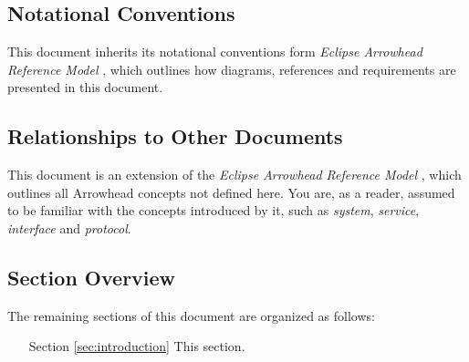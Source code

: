\subsection{Notational Conventions}
\label{sec:introduction:conventions}

This document inherits its notational conventions form \textit{Eclipse Arrowhead Reference Model} \cite{palm2021reference}, which outlines how diagrams, references and requirements are presented in this document.

\subsection{Relationships to Other Documents}
\label{sec:introduction:relationships}

This document is an extension of the \textit{Eclipse Arrowhead Reference Model} \cite{palm2021reference}, which outlines all Arrowhead concepts not defined here.
You are, as a reader, assumed to be familiar with the concepts introduced by it, such as \textit{system}, \textit{service}, \textit{interface} and \textit{protocol}.

\subsection{Section Overview}
\label{sec:introduction:sections}

The remaining sections of this document are organized as follows:
\vspace*{2mm}
\begin{itemize}[leftmargin=2cm,rightmargin=0pt,labelwidth=2cm,labelsep=0pt,itemindent=0pt,parsep=0.1cm,topsep=0.1cm,align=left]

\item[Section \ref{sec:introduction}]
This section.

\end{itemize}
